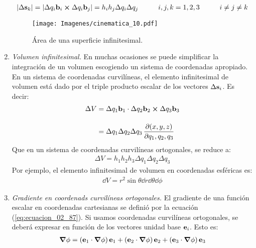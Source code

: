 \documentclass[12pt]{article}
\begin{document}
\begin{enumerate}
\begin{align}
        \abs{\Delta \vb{s}_{k}} = \abs{\Delta q_{i} \vb{b}_{i} \cp \Delta q_{i} \vb{b}_{j}} = h_{i} h_{j} \Delta q_{i} \Delta q_{j} \hspace{1cm} i, j, k =1, 2, 3 \hspace{1cm} i \neq j \neq k
        \label{eq:ecuacion_02_92}
    \end{align}
    \begin{figure}[H]
    \centering
    \texttt{[image: Imagenes/cinematica\_10.pdf]}
    \caption{Área de una superficie infinitesimal.}
    \label{fig:figura_02_10}
\end{figure}
    \item \emph{Volumen infinitesimal. } En muchas ocasiones se puede simplificar la  integración de un volumen escogiendo un sistema de coordenadas apropiado. En un sistema de coordenadas curvilíneas, el elemento infinitesimal de volumen está dado por el triple producto escalar de los vectores $\Delta \vb{s}_{i}$. Es decir:
    \begin{align}
    \begin{aligned}[b]
        \Delta V &= \Delta q_{1} \vb{b}_{1} \cdot \Delta q_{2} \vb{b}_{2} \cp \Delta q_{3} \vb{b}_{3} \\[1em]
        &= \Delta q_{1} \Delta q_{2} \Delta q_{3} \, \pdv{(x, y, z)}{q_{1}, q_{2}, q_{3}}
    \end{aligned}
    \label{eq:ecuacion_02_93}
    \end{align}
    Que en un sistema de coordenadas curvilíneas ortogonales, se reduce a:
    \begin{align}
        \Delta V = h_{1} h_{2} h_{3} \Delta q_{1} \Delta q_{2} \Delta q_{3}
        \label{eq:ecuacion_02_94}
    \end{align}
    Por ejemplo, el elemento infinitesimal de volumen en coordenadas esféricas es:
    \begin{align*}
        \dd{V} = r^{2} \sin \theta \dd{r} \dd{\theta} \dd{\phi}
    \end{align*}
    \item \emph{Gradiente en coordenads curvilíneas ortogonales. } El gradiente de una función escalar en coordenadas cartesianas se definió por la ecuación (\ref{eq:ecuacion_02_87}). Si usamos coordenadas curvilíneas ortogonales, se deberá expresar en función de los vectores unidad base $\vb{e}_{i}$. Esto es:
    \begin{align*}
        \grad{\phi} = \left( \vb{e}_{1} \cdot \grad{\phi} \right) \vb{e}_{1} + \left( \vb{e}_{2} \cdot \grad{\phi} \right) \vb{e}_{2} + \left( \vb{e}_{3} \cdot \grad{\phi} \right) \vb{e}_{3}

\end{align*}
\end{enumerate}
\end{document}
